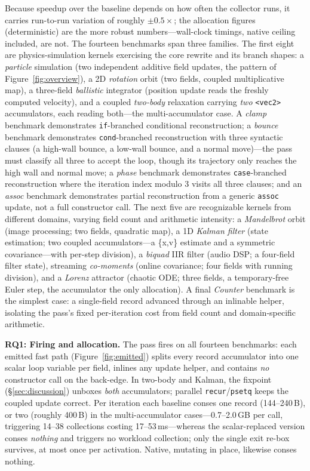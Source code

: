 \documentclass[sigplan,screen,review,anonymous]{acmart}
\begin{document}
Because speedup over the baseline depends on how often the collector runs, it
carries run-to-run variation of roughly $\pm0.5\times$; the allocation figures
(deterministic) are the more robust numbers---wall-clock timings, native
ceiling included, are not. The fourteen benchmarks span three families. The first eight are
physics-simulation kernels exercising the core rewrite and its branch
shapes: a \emph{particle} simulation (two independent additive field updates,
the pattern of Figure~\ref{fig:overview}), a 2D \emph{rotation} orbit (two
fields, coupled multiplicative map), a three-field \emph{ballistic}
integrator (position update reads the freshly computed velocity), and a
coupled \emph{two-body} relaxation carrying \emph{two} \texttt{<vec2>}
accumulators, each reading both---the multi-accumulator case. A \emph{clamp}
benchmark demonstrates \texttt{if}-branched conditional reconstruction; a
\emph{bounce} benchmark demonstrates \texttt{cond}-branched reconstruction
with three syntactic clauses (a high-wall bounce, a low-wall bounce, and a
normal move)---the pass must classify all three to accept the
loop, though its trajectory only reaches the high wall and
normal move; a \emph{phase} benchmark demonstrates \texttt{case}-branched
reconstruction where the iteration index modulo 3 visits
all three clauses; and an
\emph{assoc} benchmark demonstrates partial reconstruction from a generic
\texttt{assoc} update, not a full constructor call. The next five are recognizable
kernels from different domains, varying field count and arithmetic
intensity: a \emph{Mandelbrot} orbit (image processing; two fields, quadratic
map), a 1D \emph{Kalman filter} (state estimation; two coupled
accumulators---a \{x,v\} estimate and a symmetric covariance---with per-step
division), a \emph{biquad} IIR filter (audio DSP; a four-field filter state),
streaming \emph{co-moments} (online covariance; four fields with running
division), and a \emph{Lorenz} attractor (chaotic ODE; three fields, a
temporary-free Euler step, the accumulator the only allocation). A final
\emph{Counter} benchmark is the simplest case: a single-field record
advanced through an inlinable helper, isolating the pass's fixed per-iteration
cost from field count and domain-specific arithmetic.

\textbf{RQ1: Firing and allocation.} The pass fires on all fourteen
benchmarks: each emitted fast path (Figure~\ref{fig:emitted}) splits every
record accumulator into one scalar loop variable per field, inlines any
update helper, and contains \emph{no} constructor call on the back-edge.
In two-body and Kalman, the fixpoint (\S\ref{sec:discussion})
unboxes \emph{both} accumulators; parallel \texttt{recur}/\texttt{psetq}
keeps the coupled update correct. Per iteration each baseline conses one
record (144--240\,B), or two (roughly 400\,B) in the multi-accumulator
cases---0.7--2.0\,GB per call, triggering 14--38 collections costing
17--53\,ms---whereas the scalar-replaced version conses \emph{nothing} and
triggers no workload collection; only the single exit re-box
survives, at most once per activation. Native, mutating in place, likewise
conses nothing.
\end{document}
